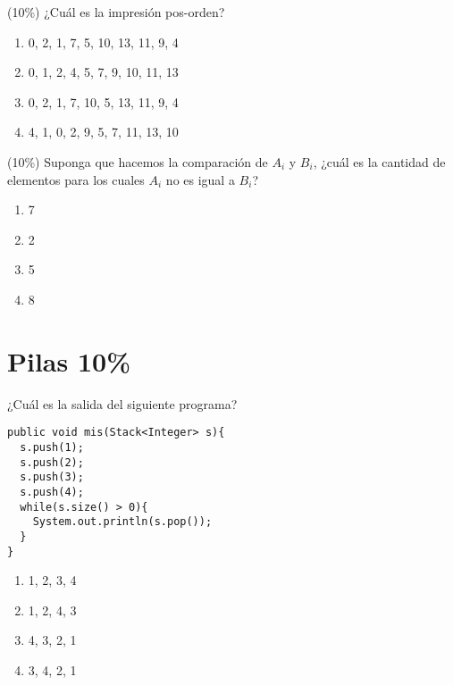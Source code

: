 \documentclass[twocolumn]{article}
\begin{document}
\noindent
(10\%) ¿Cuál es la impresión pos-orden?
\begin{enumerate}[label=\Alph*.]
\item 0, 2, 1, 7, 5, 10, 13, 11, 9, 4
\item 0, 1, 2, 4, 5, 7, 9, 10, 11, 13
\item 0, 2, 1, 7, 10, 5, 13, 11, 9, 4   
\item 4, 1, 0, 2, 9, 5, 7, 11, 13, 10 \\
\end{enumerate}

\noindent
(10\%) Suponga que hacemos la comparación de $A_i$ y $B_i$, ¿cuál es la cantidad de elementos para los cuales $A_i$ no es igual a $B_i$?
\begin{enumerate}[label=\Alph*.]
\item 7
\item 2
\item 5
\item 8	
\end{enumerate}




\section{Pilas 10\%}

¿Cuál es la salida del siguiente programa?

\begin{verbatim}
public void mis(Stack<Integer> s){
  s.push(1);
  s.push(2);
  s.push(3);
  s.push(4);
  while(s.size() > 0){
    System.out.println(s.pop());	
  }
}
\end{verbatim}

\begin{enumerate}[label=\Alph*.]
\item 1, 2, 3, 4
\item 1, 2, 4, 3
\item 4, 3, 2, 1
\item 3, 4, 2, 1
\end{enumerate}
\end{document}
